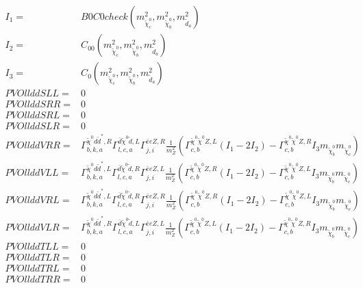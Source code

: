 \documentclass[A4,landscape]{article}
\begin{document}
\begin{align} 
I_1= & B0C0check(m^2_{\tilde{\chi}^0_{{c}}}, m^2_{\tilde{\chi}^0_{{b}}}, m^2_{\tilde{d}_{{a}}}) \\ 
I_2= & C_{00}(m^2_{\tilde{\chi}^0_{{c}}}, m^2_{\tilde{\chi}^0_{{b}}}, m^2_{\tilde{d}_{{a}}}) \\ 
I_3= & C_0(m^2_{\tilde{\chi}^0_{{c}}}, m^2_{\tilde{\chi}^0_{{b}}}, m^2_{\tilde{d}_{{a}}}) \\ 
  PVOllddSLL= & 0 \\ 
  PVOllddSRR= & 0 \\ 
  PVOllddSRL= & 0 \\ 
  PVOllddSLR= & 0 \\ 
  PVOllddVRR= &  \Gamma^{\tilde{\chi}^0 d \tilde{d}^*,R}_{b, k, a} \Gamma^{\bar{d}\tilde{\chi}^0 \tilde{d} ,L}_{l, c, a} \Gamma^{\bar{e}e Z ,R}_{j, i} \frac{1}{m^2_{Z}} (\Gamma^{\tilde{\chi}^0 \tilde{\chi}^0 Z ,L}_{c, b} (I_1 - 2 I_2) - \Gamma^{\tilde{\chi}^0 \tilde{\chi}^0 Z ,R}_{c, b} I_3 m_{\tilde{\chi}^0_{{b}}} m_{\tilde{\chi}^0_{{c}}}) \\ 
  PVOllddVLL= &  \Gamma^{\tilde{\chi}^0 d \tilde{d}^*,L}_{b, k, a} \Gamma^{\bar{d}\tilde{\chi}^0 \tilde{d} ,R}_{l, c, a} \Gamma^{\bar{e}e Z ,L}_{j, i} \frac{1}{m^2_{Z}} (\Gamma^{\tilde{\chi}^0 \tilde{\chi}^0 Z ,R}_{c, b} (I_1 - 2 I_2) - \Gamma^{\tilde{\chi}^0 \tilde{\chi}^0 Z ,L}_{c, b} I_3 m_{\tilde{\chi}^0_{{b}}} m_{\tilde{\chi}^0_{{c}}}) \\ 
  PVOllddVRL= &  \Gamma^{\tilde{\chi}^0 d \tilde{d}^*,L}_{b, k, a} \Gamma^{\bar{d}\tilde{\chi}^0 \tilde{d} ,R}_{l, c, a} \Gamma^{\bar{e}e Z ,R}_{j, i} \frac{1}{m^2_{Z}} (\Gamma^{\tilde{\chi}^0 \tilde{\chi}^0 Z ,R}_{c, b} (I_1 - 2 I_2) - \Gamma^{\tilde{\chi}^0 \tilde{\chi}^0 Z ,L}_{c, b} I_3 m_{\tilde{\chi}^0_{{b}}} m_{\tilde{\chi}^0_{{c}}}) \\ 
  PVOllddVLR= &  \Gamma^{\tilde{\chi}^0 d \tilde{d}^*,R}_{b, k, a} \Gamma^{\bar{d}\tilde{\chi}^0 \tilde{d} ,L}_{l, c, a} \Gamma^{\bar{e}e Z ,L}_{j, i} \frac{1}{m^2_{Z}} (\Gamma^{\tilde{\chi}^0 \tilde{\chi}^0 Z ,L}_{c, b} (I_1 - 2 I_2) - \Gamma^{\tilde{\chi}^0 \tilde{\chi}^0 Z ,R}_{c, b} I_3 m_{\tilde{\chi}^0_{{b}}} m_{\tilde{\chi}^0_{{c}}}) \\ 
  PVOllddTLL= & 0 \\ 
  PVOllddTLR= & 0 \\ 
  PVOllddTRL= & 0 \\ 
  PVOllddTRR= & 0 \\ 
\end{align} 
\end{document}

